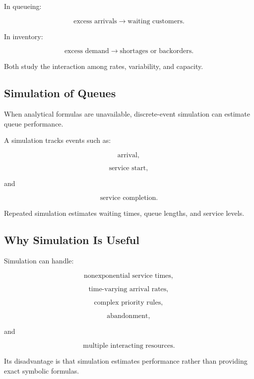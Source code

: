 In queueing:

\[
\boxed{
\text{excess arrivals}
\rightarrow
\text{waiting customers}.
}
\]

In inventory:

\[
\boxed{
\text{excess demand}
\rightarrow
\text{shortages or backorders}.
}
\]

Both study the interaction among rates, variability, and capacity.

\subsection{Simulation of Queues}
\label{subsec:queue-simulation}

When analytical formulas are unavailable, discrete-event simulation can
estimate queue performance.

A simulation tracks events such as:

\[
\boxed{
\text{arrival},
}
\]

\[
\boxed{
\text{service start},
}
\]

and

\[
\boxed{
\text{service completion}.
}
\]

Repeated simulation estimates waiting times, queue lengths, and service
levels.

\subsection{Why Simulation Is Useful}
\label{subsec:why-queue-simulation}

Simulation can handle:

\[
\boxed{
\text{nonexponential service times},
}
\]

\[
\boxed{
\text{time-varying arrival rates},
}
\]

\[
\boxed{
\text{complex priority rules},
}
\]

\[
\boxed{
\text{abandonment},
}
\]

and

\[
\boxed{
\text{multiple interacting resources}.
}
\]

Its disadvantage is that simulation estimates performance rather than
providing exact symbolic formulas.

